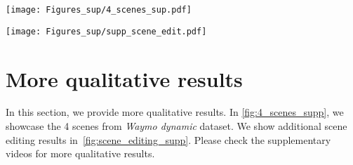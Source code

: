 \begin{figure*}[t!]
  \centering
   \texttt{[image: Figures\_sup/4\_scenes\_sup.pdf]}
   \caption{Visualization of 4 selected scenes from \textit{Waymo Dynamic} dataset. For each scene, we aggregate 50 frames. In the first row, points are color-coded by the intensity values(0 ~\bwrDyNFL~ 0.25). In the second row, dynamic vehicles are painted as \textcolor{yellow}{yellow}.}
   \label{fig:4_scenes_supp}
\end{figure*}

\begin{figure*}[t!]
  \centering
   \texttt{[image: Figures\_sup/supp\_scene\_edit.pdf]}
   \caption{Visualization of scene editing capabilities. We showcase 3 kinds of scene editing capabilities including vehicle removal(left), trajectory manipulation(middle) and vehicle insertion(right). The first row represents the original scenes, the second row demonstrates the scenes after editing. All points are color-coded by the intensity values(0 ~\bwrDyNFL~ 0.25).}
   \label{fig:scene_editing_supp}
\end{figure*}

\section{More qualitative results}\label{sec:sup_visual}
In this section, we provide more qualitative results. In \cref{fig:4_scenes_supp}, we showcase the 4 scenes from \textit{Waymo dynamic} dataset. We show additional scene editing results in~\cref{fig:scene_editing_supp}. Please check the supplementary videos for more qualitative results.
